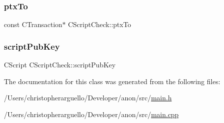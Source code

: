 \mbox{\label{class_c_script_check_ac22505a5889791918c2271fd2692e32a}} 
\subsubsection{\texorpdfstring{ptx\+To}{ptxTo}}
{\footnotesize\ttfamily const C\+Transaction$\ast$ C\+Script\+Check\+::ptx\+To\hspace{0.3cm}{\ttfamily [private]}}

\mbox{\label{class_c_script_check_a1042feefe3b4706d236edea898e40954}} 
\subsubsection{\texorpdfstring{script\+Pub\+Key}{scriptPubKey}}
{\footnotesize\ttfamily C\+Script C\+Script\+Check\+::script\+Pub\+Key\hspace{0.3cm}{\ttfamily [private]}}



The documentation for this class was generated from the following files\+:\begin{DoxyCompactItemize}
\item 
/\+Users/christopherarguello/\+Developer/anon/src/\mbox{\hyperlink{main_8h}{main.\+h}}\item 
/\+Users/christopherarguello/\+Developer/anon/src/\mbox{\hyperlink{main_8cpp}{main.\+cpp}}\end{DoxyCompactItemize}
